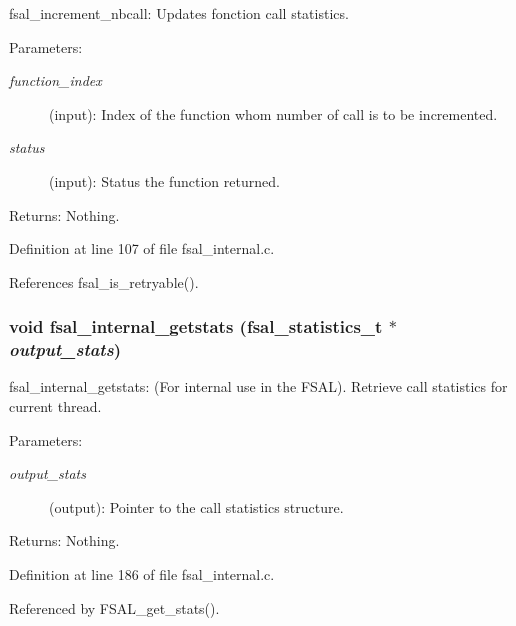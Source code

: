 fsal\_\-increment\_\-nbcall: Updates fonction call statistics.

\begin{Desc}
\item[Parameters:]
\begin{description}
\item[{\em function\_\-index}](input): Index of the function whom number of call is to be incremented. \item[{\em status}](input): Status the function returned.\end{description}
\end{Desc}
\begin{Desc}
\item[Returns:]Nothing. \end{Desc}


Definition at line 107 of file fsal\_\-internal.c.

References fsal\_\-is\_\-retryable().
\subsubsection[{fsal\_\-internal\_\-getstats}]{\setlength{\rightskip}{0pt plus 5cm}void fsal\_\-internal\_\-getstats (fsal\_\-statistics\_\-t $\ast$ {\em output\_\-stats})}\label{fsal__internal_8c_6de88949985cac9da4cd3fb302fb80a7}


fsal\_\-internal\_\-getstats: (For internal use in the FSAL). Retrieve call statistics for current thread.

\begin{Desc}
\item[Parameters:]
\begin{description}
\item[{\em output\_\-stats}](output): Pointer to the call statistics structure.\end{description}
\end{Desc}
\begin{Desc}
\item[Returns:]Nothing. \end{Desc}


Definition at line 186 of file fsal\_\-internal.c.

Referenced by FSAL\_\-get\_\-stats().
